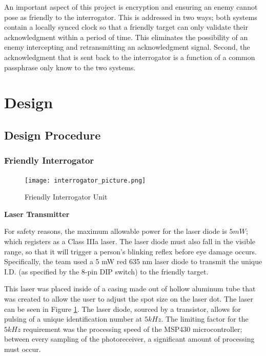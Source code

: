 \documentclass[letterpaper,10pt]{article}
\begin{document}
\begin{spacing}{1.15}
An important aspect of this project is encryption and ensuring an enemy cannot pose as friendly to the interrogator. This is addressed in two ways; both systems contain a locally synced clock so that a friendly target can only validate their acknowledgment within a period of time. This eliminates the possibility of an enemy intercepting and retransmitting an acknowledgment signal. Second, the acknowledgment that is sent back to the interrogator is a function of a common passphrase only know to the two systems.

\section{Design}

\subsection{Design Procedure} 

\subsubsection{Friendly Interrogator}
\begin{figure} [H]
	\centering
	\texttt{[image: interrogator\_picture.png]}
	\caption{Friendly Interrogator Unit\label{fig:interrogator-picture}}
\end{figure}

\hspace{5mm}\textbf{Laser Transmitter} \label{section:laser-transmitter-design-procedure}

For safety reasons, the maximum allowable power for the laser diode is $5mW$; which registers as a Class IIIa laser. The laser diode must also fall in the visible range, so that it will trigger a person's blinking reflex before eye damage occurs. Specifically, the team used a 5 mW red 635 nm laser diode to transmit the unique I.D. (as specified by the 8-pin DIP switch) to the friendly target. 

This laser was placed inside of a casing made out of hollow aluminum tube that was created to allow the user to adjust the spot size on the laser dot. The laser can be seen in Figure \ref{fig:interrogator-picture}. The laser diode, sourced by a transistor, allows for pulsing of a unique identification number at $5kHz$. The limiting factor for the $5kHz$ requirement was the processing speed of the MSP430 microcontroller; between every sampling of the photoreceiver, a significant amount of processing must occur. 


\end{spacing}
\end{document}
